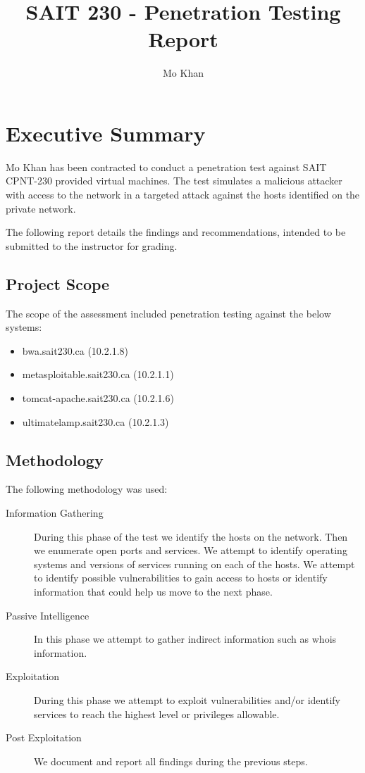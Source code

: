 \documentclass{article}
\title{SAIT 230 - Penetration Testing Report}
\author{Mo Khan}
\begin{document}
\maketitle
\newpage
\tableofcontents
\newpage
{}

\section{Executive Summary}

Mo Khan has been contracted to conduct a penetration test against SAIT CPNT-230 provided
virtual machines. The test simulates a malicious attacker with access to the
network in a targeted attack against the hosts identified on the private network.

The following report details the findings and recommendations, intended to be submitted
to the instructor for grading.

\subsection{Project Scope}

The scope of the assessment included penetration testing against the below systems:

\begin{itemize}
  \item bwa.sait230.ca (10.2.1.8)
  \item metasploitable.sait230.ca (10.2.1.1)
  \item tomcat-apache.sait230.ca (10.2.1.6)
  \item ultimatelamp.sait230.ca (10.2.1.3)
\end{itemize}

\subsection{Methodology}

The following methodology was used:

\begin{description}
  \item[Information Gathering] During this phase of the test we identify the hosts on the network. Then we enumerate open ports and services. We attempt to identify operating systems and versions of services running on each of the hosts. We attempt to identify possible vulnerabilities to gain access to hosts or identify information that could help us move to the next phase.
  \item[Passive Intelligence] In this phase we attempt to gather indirect information such as whois information.
  \item[Exploitation] During this phase we attempt to exploit vulnerabilities and/or identify services to reach the highest level or privileges allowable.
  \item[Post Exploitation] We document and report all findings during the previous steps.
\end{description}
\end{document}
